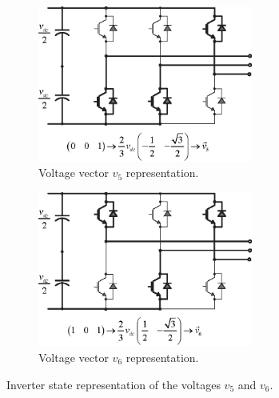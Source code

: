 \documentclass[11pt,a4paper,oneside]{book}
\numberwithin{equation}{section}
\theoremstyle{it}
\theoremstyle{definition}
\begin{document}
\begin{figure}[H]
	\centering
	\begin{subfigure}{0.5\textwidth}
		\centering
		\includegraphics[width = 200pt, angle = 0, 
		keepaspectratio]{figures/vector_modulator/space_vector_6.eps}
		\captionsetup{width=0.45\textwidth, font=footnotesize}	
		\caption{Voltage vector $v_5$ representation.}
		\label{space_vector_6}
	\end{subfigure}%
	\begin{subfigure}{0.5\textwidth}
		\centering
		\includegraphics[width = 200pt, angle = 0, 
		keepaspectratio]{figures/vector_modulator/space_vector_7.eps}
		\captionsetup{width=0.45\textwidth, font=footnotesize}	
		\caption{Voltage vector $v_6$ representation.}
		\label{space_vector_7}
	\end{subfigure}
	\captionsetup{width=0.5\textwidth, font=small}	
	\caption{Inverter state representation of the voltages $v_5$ and $v_6$.}
	\label{space_vector_67}
\end{figure}
\end{document}
